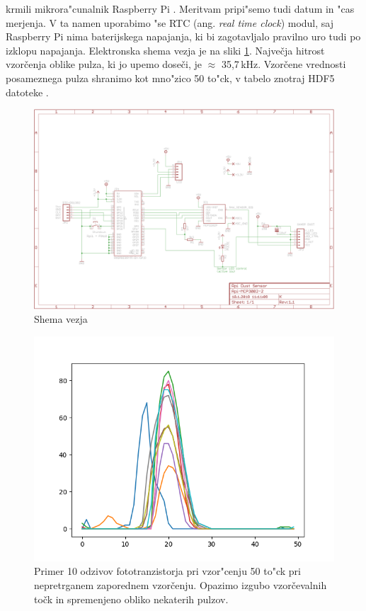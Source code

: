 \documentclass[11pt,a4paper]{article}
\begin{document}
krmili mikrora"cunalnik Raspberry Pi \cite{rbpi-wiki}. Meritvam pripi"semo tudi datum in "cas merjenja. V ta namen uporabimo "se RTC (ang. \textit{real time clock}) modul, saj Raspberry Pi nima baterijskega napajanja, ki bi zagotavljalo pravilno uro tudi po izklopu napajanja. Elektronska shema vezja je na sliki \ref{sl:shema-vezja}.
Največja hitrost vzorčenja oblike pulza, ki jo upemo doseči, je $ \approx $ 35,7\,kHz. Vzorčene vrednosti posameznega pulza shranimo kot mno"zico 50 to"ck, v tabelo znotraj HDF5 datoteke \cite{hdf5}.


\begin{figure}[H]
	\begin{center}
		\includegraphics[width=12cm]{scheme.png}
		\caption{Shema vezja}
		\label{sl:shema-vezja}
	\end{center}
\end{figure}


\begin{figure}[H]
	\begin{center}
		\includegraphics[width=12cm]{pulses_old.png}
		\caption{Primer 10 odzivov fototranzistorja pri vzor"cenju 50 to"ck pri nepretrganem zaporednem vzorčenju. Opazimo izgubo vzorčevalnih točk in spremenjeno obliko nekaterih pulzov.}
		\label{pulses-old}
	\end{center}
\end{figure}
\end{document}
